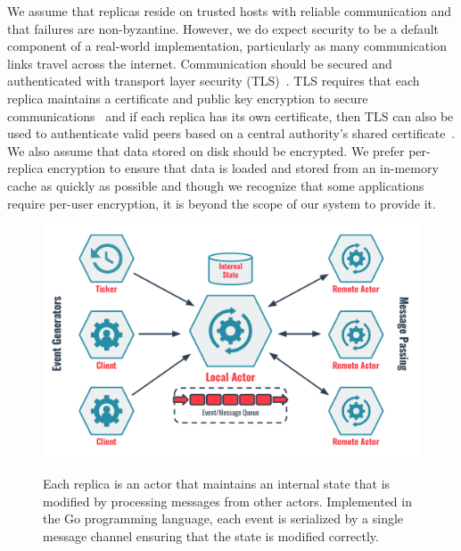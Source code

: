 We assume that replicas reside on trusted hosts with reliable communication and that failures are non-byzantine.
However, we do expect security to be a default component of a real-world implementation, particularly as many communication links travel across the internet.
Communication should be secured and authenticated with transport layer security (TLS)~\cite{tlsv1,tlsv2}.
TLS requires that each replica maintains a certificate and public key encryption to secure communications~\cite{rsa} and if each replica has its own certificate, then TLS can also be used to authenticate valid peers based on a central authority's shared certificate~\cite{tls_authentication}.
We also assume that data stored on disk should be encrypted.
We prefer per-replica encryption to ensure that data is loaded and stored from an in-memory cache as quickly as possible and though we recognize that some applications require per-user encryption, it is beyond the scope of our system to provide it.

\begin{figure}
    \begin{center}
        \includegraphics[width=5in]{figures/ch05_actor_model.pdf}
    \end{center}
    \renewcommand{\baselinestretch}{1}
    \small\normalsize

    \begin{quote}
        \caption[Replica Actor Model]{Each replica is an actor that maintains an internal state that is modified by processing messages from other actors. Implemented in the Go programming language, each event is serialized by a single message channel ensuring that the state is modified correctly.}
        \label{fig:ch05_actor_model}
    \end{quote}
\end{figure}
\renewcommand{\baselinestretch}{2}
\small\normalsize

